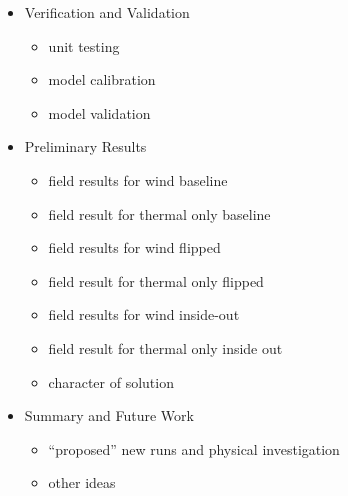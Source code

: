 \documentclass{article}
\begin{document}
\begin{itemize}
 \item Verification and Validation
       \begin{itemize}
	\item unit testing 
	\item model calibration
	\item model validation
       \end{itemize}

 \item Preliminary Results
       \begin{itemize}
	\item field results for wind baseline
	\item field result for thermal only baseline

	\item field results for wind flipped
	\item field result for thermal only flipped

	\item field results for wind inside-out
	\item field result for thermal only inside out

	\item character of solution
       \end{itemize}
 \item Summary and Future Work
       \begin{itemize}
	\item ``proposed'' new runs and physical investigation
	\item other ideas
       \end{itemize}

\end{itemize}
\end{document}
